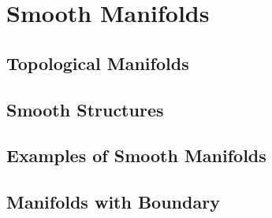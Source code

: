 \chapter{Smooth Manifolds}

\section{Topological Manifolds}

\section{Smooth Structures}

\section{Examples of Smooth Manifolds}

\section{Manifolds with Boundary}

